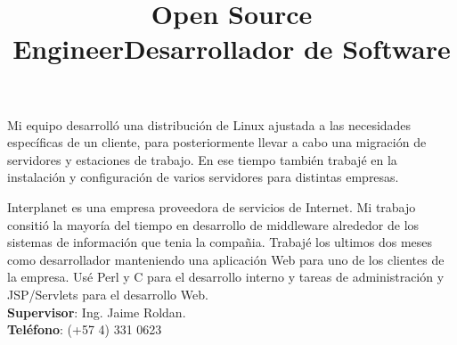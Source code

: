 \begin{resume}
\title{\textbf{Open Source Engineer}}
\begin{position}
Mi equipo desarroll\'{o} una distribuci\'{o}n de Linux ajustada a las
necesidades espec\'{i}ficas de un cliente, para posteriormente llevar
a cabo una  migraci\'{o}n de servidores y estaciones de trabajo. En ese tiempo tambi\'{e}n trabaj\'{e} en
la instalaci\'{o}n y configuraci\'{o}n de varios servidores para
distintas empresas.
\end{position}
 \newline
 \newline
 \newline
 \newline
 \newline

\title{\textbf{Desarrollador de Software}}
\begin{position}
Interplanet es una empresa proveedora de servicios de Internet. Mi trabajo consiti\'{o} la mayor\'{i}a del tiempo en desarrollo de middleware alrededor de los sistemas de informaci\'{o}n que tenia  la compa\~{n}ia.
Trabaj\'{e} los ultimos dos meses como desarrollador manteniendo una aplicaci\'{o}n Web para uno de los clientes de la empresa. Us\'{e} Perl y C para el desarrollo interno y tareas de administraci\'{o}n y JSP/Servlets para el desarrollo Web.\\
\textbf{Supervisor}:  Ing. Jaime Roldan.\\
\textbf{Tel\'{e}fono}:  (+57 4) 331 0623 
\end{position}




\end{resume}
